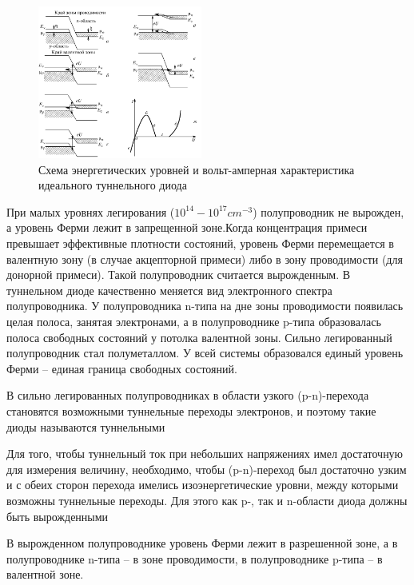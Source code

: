 \documentclass[a4paper,12pt]{article}
\begin{document}
\begin{figure}
  \begin{center}
    \includegraphics[width=0.48\textwidth]{fig1}
  \end{center}
  \caption{Схема энергетических уровней и вольт-амперная характеристика идеального туннельного диода}
\end{figure}

При малых уровнях легирования ($10^{14} - 10^{17} cm^{-3}$) полупроводник не вырожден, а уровень Ферми лежит в запрещенной зоне.Когда концентрация примеси превышает эффективные плотности состояний, уровень Ферми перемещается в валентную зону (в случае акцепторной примеси) либо в зону проводимости (для донорной примеси). Такой полупроводник считается вырожденным. В туннельном диоде качественно меняется вид электронного спектра полупроводника. У полупроводника n-типа на дне зоны проводимости появилась целая полоса, занятая электронами, а в полупроводнике p-типа образовалась полоса свободных состояний у потолка валентной зоны. Сильно легированный полупроводник стал полуметаллом. У всей системы образовался единый уровень Ферми -- единая граница свободных состояний.

В  сильно легированных полупроводниках в области узкого (p-n)-перехода становятся возможными туннельные переходы электронов, и поэтому такие диоды называются туннельными

Для того, чтобы туннельный ток при небольших напряжениях имел достаточную для измерения величину, необходимо, чтобы (p-n)-переход был достаточно узким и с обеих сторон перехода имелись изоэнергетические уровни, между которыми возможны туннельные переходы. Для этого как p-, так и n-области диода должны быть вырожденными

В вырожденном полупроводнике уровень Ферми лежит в разрешенной зоне, а в полупроводнике n-типа -- в зоне проводимости, в полупроводнике p-типа -- в валентной зоне.
\end{document}
